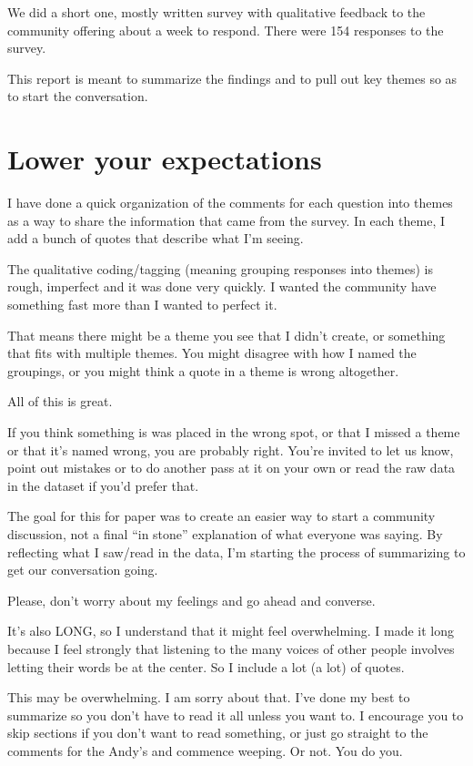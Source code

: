 \documentclass[
]{book}
\begin{document}
We did a short one, mostly written survey with qualitative feedback to the community offering about a week to respond. There were 154 responses to the survey.

This report is meant to summarize the findings and to pull out key themes so as to start the conversation.

\section{Lower your expectations}\label{lower-your-expectations}

I have done a quick organization of the comments for each question into themes as a way to share the information that came from the survey. In each theme, I add a bunch of quotes that describe what I'm seeing.

The qualitative coding/tagging (meaning grouping responses into themes) is rough, imperfect and it was done very quickly. I wanted the community have something fast more than I wanted to perfect it.

That means there might be a theme you see that I didn't create, or something that fits with multiple themes. You might disagree with how I named the groupings, or you might think a quote in a theme is wrong altogether.

All of this is great.

If you think something is was placed in the wrong spot, or that I missed a theme or that it's named wrong, you are probably right. You're invited to let us know, point out mistakes or to do another pass at it on your own or read the raw data in the dataset if you'd prefer that.

The goal for this for paper was to create an easier way to start a community discussion, not a final ``in stone'' explanation of what everyone was saying. By reflecting what I saw/read in the data, I'm starting the process of summarizing to get our conversation going.

Please, don't worry about my feelings and go ahead and converse.

It's also LONG, so I understand that it might feel overwhelming. I made it long because I feel strongly that listening to the many voices of other people involves letting their words be at the center. So I include a lot (a lot) of quotes.

This may be overwhelming. I am sorry about that. I've done my best to summarize so you don't have to read it all unless you want to. I encourage you to skip sections if you don't want to read something, or just go straight to the comments for the Andy's and commence weeping. Or not. You do you.
\end{document}
